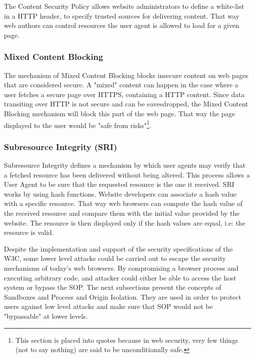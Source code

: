 \documentclass[journal]{IEEEtran}
\begin{document}
The Content Security Policy allows website administrators to define a white-list in a HTTP header, to specify trusted sources for delivering content. That way web authors can control resources the user agent is allowed to load for a given page.

\subsubsection{Mixed Content Blocking}

The mechanism of Mixed Content Blocking blocks insecure content on web pages that are considered secure. A "mixed" content can happen in the case where a user fetches a secure page over HTTPS, containing a HTTP content. Since data transiting over HTTP is not secure and can be eavesdropped, the Mixed Content Blocking mechanism will block this part of the web page. That way the page displayed to the user would be "safe from risks"\footnote{This section is placed into quotes because in web security, very few things (not to say nothing) are said to be unconditionally safe.}.

\subsubsection{Subresource Integrity (SRI)}

Subresource Integrity defines a mechanism by which user agents may verify that a fetched resource has been delivered without being altered. This process allows a User Agent to be sure that the requested resource is the one it received. SRI works by using hash functions. Website developers can associate a hash value with a specific resource. That way web browsers can compute the hash value of the received resource and compare them with the initial value provided by the website. The resource is then displayed only if the hash values are equal, i.e: the resource is valid.

\medskip
\medskip

Despite the implementation and support of the security specifications of the W3C, some lower level attacks could be carried out to escape the security mechanisms of today's web browsers. By compromising a browser process and executing arbitrary code, and attacker could either be able to access the host system or bypass the SOP. The next subsections present the concepts of Sandboxes and Process and Origin Isolation. They are used in order to protect users against low level attacks and make sure that SOP would not be "bypassable" at lower levels.
\end{document}
